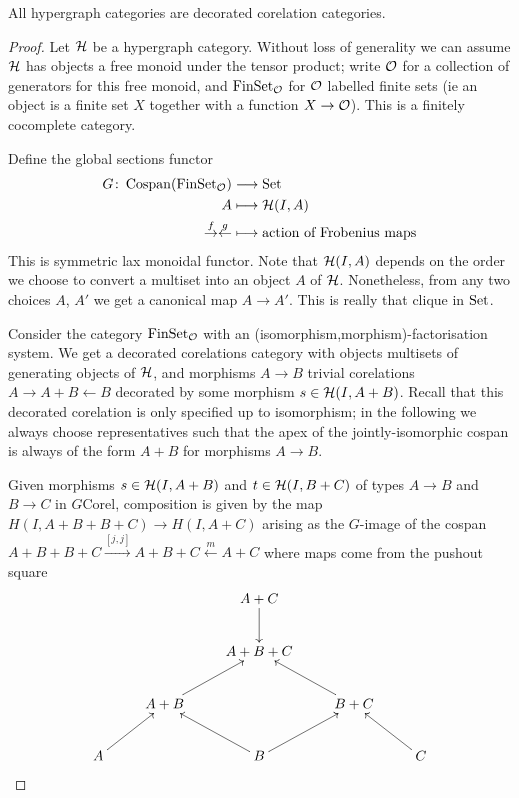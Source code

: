 \begin{theorem}
  All hypergraph categories are decorated corelation categories.
\end{theorem}
\begin{proof}
  Let $\mathcal H$ be a hypergraph category. Without loss of generality we can assume
  $\mathcal H$ has objects a free monoid under the tensor product; write $\mathcal O$ for
  a collection of generators for this free monoid, and $\mathrm{FinSet}_{\mathcal O}$ for
  $\mathcal O$ labelled finite sets (ie an object is a finite set $X$ together with a
  function $X \to \mathcal O$). This is a finitely cocomplete category.

  Define the global sections functor 
  \begin{align*}
    G{\colon} \operatorname{{Cospan}}(\mathrm{FinSet}_{\mathcal O}) &\longrightarrow \mathrm{Set} \\
    A &\longmapsto \mathcal H(I,A) \\
    \stackrel{f}{\to}\stackrel{g}{\leftarrow} &\longmapsto \textrm{action of
    Frobenius maps}
  \end{align*}
  This is symmetric lax monoidal functor. Note that $\mathcal H(I,A)$ depends on the
  order we choose to convert a multiset into an object $A$ of $\mathcal H$.
  Nonetheless, from any two choices $A$, $A'$ we get a canonical map $A \to A'$.
  This is really that clique in $\mathrm{Set}$.

  Consider the category $\mathrm{FinSet}_{\mathcal O}$ with an
  (isomorphism,morphism)-factorisation system. We get a decorated corelations
  category with objects multisets of generating objects of $\mathcal H$, and morphisms $A \to
  B$ trivial corelations $A \to A+B \leftarrow B$ decorated by some morphism
  $s \in \mathcal H(I,A+B)$. Recall that this decorated corelation is only specified
  up to isomorphism; in the following we always choose representatives such that
  the apex of the jointly-isomorphic cospan is always of the form $A+B$ for
  morphisms $A \to B$.
  
  Given morphisms $s \in \mathcal H(I,A+B)$ and $t \in \mathcal H(I,B+C)$ of types $A \to
  B$ and $B \to C$ in $G\mathrm{Corel}$, composition is given by the map
  $H(I,A+B+B+C) \to H(I,A+C)$ arising as the $G$-image of the cospan $A+B+B+C
  \stackrel{[j,j]}\rightarrow A+B+C \stackrel{m}\leftarrow A+C$ where maps come
  from the pushout square
  \[
    \xymatrix{
      && A+C \ar[d] \\
      && A+B+C \\
      & A+B \ar[ur] && B+C \ar[ul] \\
      A \ar[ur] && B \ar[ul]\ar[ur] && C \ar[ul]
    }
  \]
  

\end{proof}
